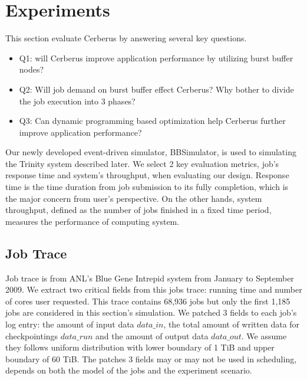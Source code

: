 \section{Experiments}
\label{Sec:Experiments}

This section evaluate Cerberus by answering several key questions.
\begin{itemize}
        \item Q1: will Cerberus improve application performance by utilizing burst buffer nodes?
        \item Q2: Will job demand on burst buffer effect Cerberus?
                Why bother to divide the job execution into 3 phases?
        \item Q3: Can dynamic programming based optimization help Cerberus further
improve application performance?
\end{itemize}
Our newly developed event-driven simulator, BBSimulator, is used to simulating
the Trinity system described later.
We select 2 key evaluation metrics, job's response time and system's throughput,
when evaluating our design.
Response time is the time duration from job submission to its fully completion,
which is the major concern from user's perspective.
On the other hands, system throughput, defined as the number of jobs finished in
a fixed time period, measures the performance of computing system.

\subsection{Job Trace}
Job trace is from ANL's Blue Gene Intrepid system
from January to September 2009\cite{JobTrace}.
We extract two critical fields from this jobs trace: running time and
number of cores user requested.
This trace contains 68,936 jobs but
only the first 1,185 jobs are considered in this section's simulation.
We patched 3 fields to each job's log entry: the amount of input data $data\_in$,
the total amount of written data for checkpointings $data\_run$
and the amount of output data $data\_out$.
We assume they follows uniform distribution with
lower boundary of 1 TiB and upper boundary of 60 TiB.
The patches 3 fields may or may not be used in scheduling,
depends on both the model of the jobs and the experiment scenario.


